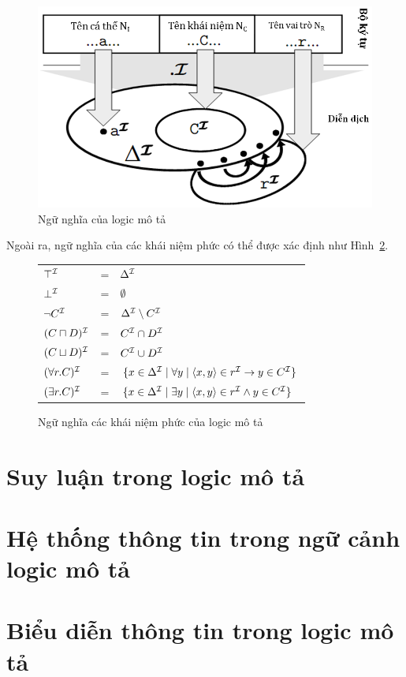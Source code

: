 \begin{figure}[h]
  \begin{center}
    \includegraphics[scale=0.4]{Images/NguNghia.png}
    \caption{Ngữ nghĩa của logic mô tả}\label{fig:Semantic}
  \end{center}
  
\end{figure}

Ngoài ra, ngữ nghĩa của các khái niệm phức có thể được xác định như Hình~\ref{fig:SemanticALC}.

\begin{figure}
  \begin{center}
    \begin{tabular}{|l c l|}
      \hline
      $\top^{\mathcal{I}}$ &\!\!\!\!=\!\!\!\!& $\Delta^{\mathcal{I}}$\\
      $\bot^{\mathcal{I}}$ &\!\!\!\!=\!\!\!\!& $\emptyset$\\
      $\neg C^{\mathcal{I}}$ &\!\!\!\!=\!\!\!\!& $\Delta^{\mathcal{I}} \setminus C^{\mathcal{I}}$\\
      $(C \sqcap D)^{\mathcal{I}}$ &\!\!\!\!=\!\!\!\!& $C^{\mathcal{I}} \cap D^{\mathcal{I}}$\\
      $(C \sqcup D)^{\mathcal{I}}$ &\!\!\!\!=\!\!\!\!& $C^{\mathcal{I}} \cup D^{\mathcal{I}}$\\
      $(\forall r.C)^{\mathcal{I}}$ &\!\!\!\!=\!\!\!\!& $\{x \in \Delta^{\mathcal{I}} \mid \forall y \mid \left\langle x, y\right\rangle \in r^{\mathcal{I}} \rightarrow y\in C^{\mathcal{I}}\}$\\
      $(\exists r.C)^{\mathcal{I}}$ &\!\!\!\!=\!\!\!\!& $\{x \in \Delta^{\mathcal{I}} \mid \exists y \mid \left\langle x, y\right\rangle \in r^{\mathcal{I}} \wedge y\in C^{\mathcal{I}}\}$\\
    
    \hline
    \end{tabular}
    \caption{Ngữ nghĩa các khái niệm phức của logic mô tả \ALC}\label{fig:SemanticALC}
  \end{center}
  
\end{figure}


\section{Suy luận trong logic mô tả}

\section{Hệ thống thông tin trong ngữ cảnh logic mô tả}

\section{Biểu diễn thông tin trong logic mô tả}

